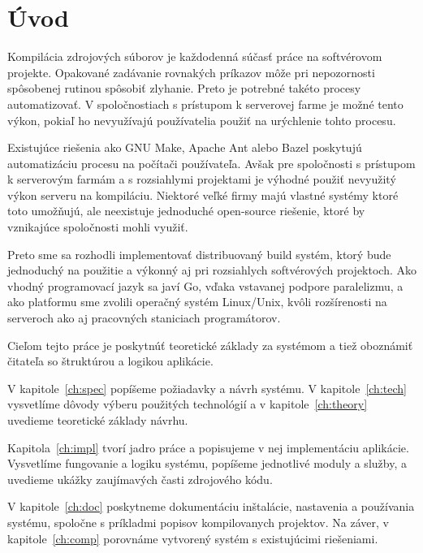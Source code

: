 \chapter*{Úvod}

Kompilácia zdrojových súborov je každodenná súčasť práce na softvérovom projekte.
Opakované zadávanie rovnakých príkazov môže pri nepozornosti spôsobenej rutinou
spôsobiť zlyhanie. Preto je potrebné takéto procesy automatizovať. V spoločnostiach
s prístupom k serverovej farme je možné tento výkon, pokiaľ ho nevyužívajú používatelia
použiť na urýchlenie tohto procesu.

Existujúce riešenia ako GNU Make, Apache Ant alebo Bazel poskytujú automatizáciu
procesu na počítači používateľa. Avšak pre spoločnosti s prístupom k serverovým
farmám a s rozsiahlymi projektami je výhodné použiť nevyužitý výkon serveru
na kompiláciu. Niektoré veľké firmy majú vlastné systémy ktoré toto umožňujú,
ale neexistuje jednoduché open-source riešenie, ktoré by vznikajúce spoločnosti
mohli využiť.

Preto sme sa rozhodli implementovať distribuovaný build systém, ktorý bude jednoduchý
na použitie a výkonný aj pri rozsiahlych softvérových projektoch. Ako vhodný programovací
jazyk sa javí Go, vďaka vstavanej podpore paralelizmu, a ako platformu sme zvolili
operačný systém Linux/Unix, kvôli rozšírenosti na serveroch ako aj pracovných staniciach
programátorov.

Cieľom tejto práce je poskytnúť teoretické základy za systémom a tiež oboznámiť
čitateľa so štruktúrou a logikou aplikácie.

V kapitole~\ref{ch:spec} popíšeme požiadavky a návrh systému. V kapitole~\ref{ch:tech}
vysvetlíme dôvody výberu použitých technológií a v kapitole~\ref{ch:theory} uvedieme
teoretické základy návrhu.

Kapitola~\ref{ch:impl} tvorí jadro práce a popisujeme v nej implementáciu aplikácie.
Vysvetlíme fungovanie a logiku systému, popíšeme jednotlivé moduly a služby, a uvedieme
ukážky zaujímavých časti zdrojového kódu.

V kapitole~\ref{ch:doc} poskytneme dokumentáciu inštalácie, nastavenia a používania systému, spoločne
s príkladmi popisov kompilovanych projektov. Na záver, v kapitole~\ref{ch:comp} porovnáme
vytvorený systém s existujúcimi riešeniami.
